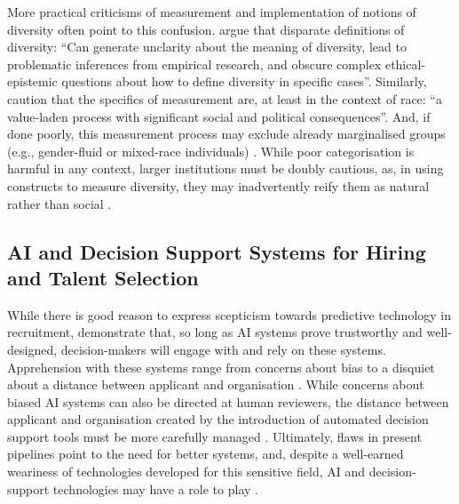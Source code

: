 More practical criticisms of measurement and implementation of notions of diversity often point to this confusion. \textcite{steel_multiple_2018} argue that disparate definitions of diversity: ``Can generate unclarity about the meaning of diversity, lead to problematic inferences from empirical research, and obscure complex ethical-epistemic questions about how to define diversity in specific cases''. Similarly, \textcite{abdu2023empirical} caution that the specifics of measurement are, at least in the context of race: ``a value-laden process with significant social and political consequences''. And, if done poorly, this measurement process may exclude already marginalised groups (e.g., gender-fluid or mixed-race individuals) \cite{scheuerman2019computers}. While poor categorisation is harmful in any context, larger institutions must be doubly cautious, as, in using constructs to measure diversity, they may inadvertently reify them as natural rather than social \cite{scheuerman2021auto}. 

\subsection{AI and Decision Support Systems for Hiring and Talent Selection}
While there is good reason to express scepticism towards predictive technology in recruitment, \textcite{Vereschak_Alizadeh_Bailly_Caramiaux_2024} demonstrate that, so long as AI systems prove trustworthy and well-designed, decision-makers will engage with and rely on these systems. Apprehension with these systems range from concerns about bias to a disquiet about a distance between applicant and organisation \cite{Lashkari_Cheng_2023}. While concerns about biased AI systems can also be directed at human reviewers, the distance between applicant and organisation created by the introduction of automated decision support tools must be more carefully managed \cite{Leung_Zhang_Jibuti_Zhao_Klein_Pierce_Robert_Zhu_2020,Lashkari_Cheng_2023}. Ultimately, flaws in present pipelines point to the need for better systems, and, despite a well-earned weariness of technologies developed for this sensitive field, AI and decision-support technologies may have a role to play \cite{kleinberg2018algorithmic,Vereschak_Alizadeh_Bailly_Caramiaux_2024,barocas2023fairness,huppenkothen2020entrofy,schumann_diverse_2019}.

